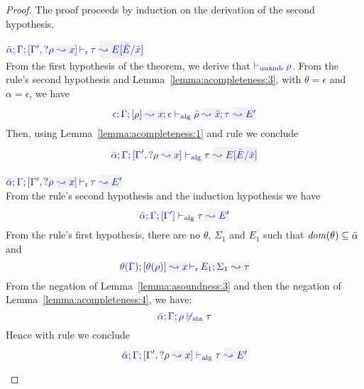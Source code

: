\begin{proof}
The proof proceeds by induction on the derivation of the second hypothesis.
\begin{description}
\setlength{\itemsep}{1em}
\item[\fbox{\rref{L-RuleMatch}}]\quad
$\dlres{\bar\alpha}{\tenv}{\tenv',\envi{\rulet}{x}}{\type}{E[\bar{E}/\bar{x}]}$ \ \\

From the first hypothesis of the theorem, we derive that ${\color{blue}  \vdash_{\mathrm{unamb}} \rho}$. From the rule's second
hypothesis and Lemma~\ref{lemma:acompleteness:3}, with $\theta=\epsilon$ and
$\alpha=\epsilon$, we have
\begin{equation*}
  \admres{\epsilon}{\tenv}{\rulet}{x}{\epsilon}{\type}{E'}{\ie{\bar\rulet}{\bar{x}}}
\end{equation*}
Then, using Lemma~\ref{lemma:acompleteness:1} and rule  we conclude
\begin{equation*}
  \adlres{\bar\alpha}{\tenv}{\tenv',\envi{\rulet}{x}}{\type}{E[\bar{E}/\bar{x}]}
\end{equation*}

\item[\fbox{\rref{L-RuleNoMatch}}]\quad
$\dlres{\bar\alpha}{\tenv}{\tenv',\envi{\rulet}{x}}{\type}{E'}$ \ \\

  From the rule's second hypothesis and the induction hypothesis we have
\begin{equation*}
  \adlres{\bar\alpha}{\tenv}{\tenv'}{\type}{E'}
\end{equation*}
From the rule's first hypothesis, there are no $\theta$, $\Sigma_1$ and $E_1$ such that
${\it dom }{(\theta)\subseteq\bar\alpha}$ and
\begin{equation*}
  \dmres{\theta(\tenv)}{\theta(\rulet)}{x}{\Sigma_1}{\type}{E_1}
\end{equation*}
From the negation of Lemma~\ref{lemma:asoundness:3} and then the negation of
Lemma~\ref{lemma:acompleteness:4}, we have:
\begin{equation*}
{\color{blue} \bar\alpha; \Gamma; \rho\not\vdash_{\mathrm{sta}}\tau}
\end{equation*}
  Hence with rule  we conclude
\begin{equation*}
  \adlres{\bar\alpha}{\tenv}{\tenv',\envi{\rulet}{x}}{\type}{E'}
\end{equation*}


\end{description}
\end{proof}

